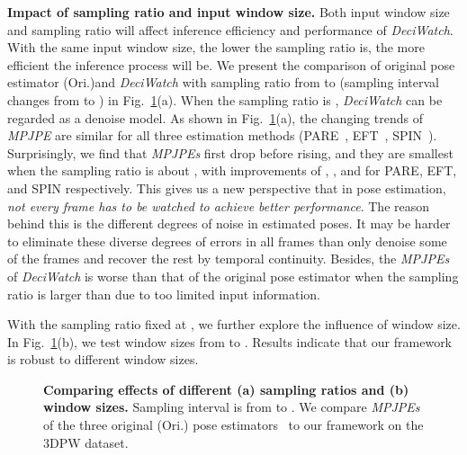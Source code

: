 \documentclass[runningheads]{llncs}
\newcommand{\name}{\emph{DeciWatch}\xspace}
\begin{document}
\noindent \textbf{Impact of sampling ratio and input window size.}
Both input window size and sampling ratio will affect inference efficiency and performance of \name. With the same input window size, the lower the sampling ratio is, the more efficient the inference process will be. We present the comparison of original pose estimator (Ori.)and \name with sampling ratio from  to  (sampling interval  changes from  to ) in Fig.~\ref{fig:supp_ablation_size}(a). When the sampling ratio is , \name can be regarded as a denoise model. As shown in Fig.~\ref{fig:supp_ablation_size}(a), the changing trends of \emph{MPJPE} are similar for all three estimation methods (PARE~\cite{kocabas2021pare}, EFT~\cite{joo2020eft}, SPIN~\cite{kolotouros2019spin}). Surprisingly, we find that \emph{MPJPEs} first drop before rising, and they are smallest when the sampling ratio is about , with improvements of , , and  for PARE, EFT, and SPIN respectively. This gives us a new perspective that in pose estimation, \emph{not every frame has to be watched to achieve better performance}. The reason behind this is the different degrees of noise in estimated poses. It may be harder to eliminate these diverse degrees of errors in all frames than only denoise some of the frames and recover the rest by temporal continuity.
Besides, the \emph{MPJPEs} of \name is worse than that of the original pose estimator when the sampling ratio is larger than  due to too limited input information.



With the sampling ratio fixed at , we further explore the influence of window size. 
In Fig.~\ref{fig:supp_ablation_size}(b), we test window sizes from  to . Results indicate that our framework is robust to different window sizes. 

\begin{figure}[h]	
\centering
    	\label{fig:sample_ratio}  
    	\label{fig:window_size} 
\caption{\textbf{Comparing effects of different (a) sampling ratios and (b) window sizes.} Sampling interval  is from  to . We compare \emph{MPJPEs} of the three original (Ori.) pose estimators~\cite{kocabas2021pare,joo2020eft,kolotouros2019spin} to our framework on the 3DPW dataset.}
\label{fig:supp_ablation_size} 
\end{figure}
\end{document}
